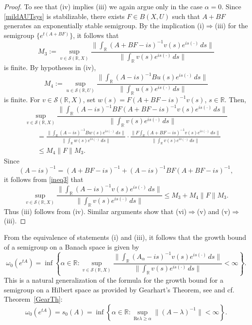 \documentclass[10pt,psamsfonts,leqno]{siamltex}
\newcommand{\bbR}{\mathbb{R}}
\newcommand{\calS}{\mathcal{S}}
\newcommand{\lb}{\label}
\begin{document}
\begin{proof}
To see that (iv) implies (iii) we again argue only in the case
$\alpha=0$. Since \eqref{mildAUTsys} is stabilizable, there exists $F\in
B(X,U)$ such that $A+BF$ generates an exponentially stable semigroup.
By the implication (i)$\Rightarrow$(iii) for the semigroup
$\{e^{t(A+BF)}\}$,
 it follows that
\begin{equation*}
M_3 := \sup_{v\in \calS(\bbR, X)}
\frac{\| \int_\bbR (A+BF-is)^{-1}v(s)e^{is(\cdot)}\,ds\| }
{\| \int_\bbR v(s)e^{is(\cdot)}\,ds\| }
\end{equation*}
is finite.  By hypotheses in (iv),
\begin{equation*}
M_4:=\sup_{u\in \calS(\bbR, U)}
\frac{\|\int_\bbR (A-is)^{-1}Bu(s)e^{is(\cdot)}\,ds\|}
{\|\int_\bbR u(s)e^{is(\cdot)}\,ds\|}
\end{equation*}
is finite.  For $v\in \calS(\bbR,X)$,
set $w(s)= F(A+BF-is)^{-1}v(s)$,
$s\in\bbR$. Then,
\begin{equation}\lb{ineq3}
\sup_{v\in \calS(\bbR, X)}
\frac{\| \int_\bbR(A-is)^{-1}BF (A+BF-is)^{-1}v(s)e^{is(\cdot)}\,ds\| }
{\| \int_\bbR v(s)e^{is(\cdot)}\,ds\| }
\end{equation}
\begin{align*}
&=\frac{\| \int_\bbR(A-is)^{-1}Bw(s)e^{is(\cdot)}\,ds\| }
{\| \int_\bbR w(s)e^{is(\cdot)}\,ds\| }\cdot\frac{\|
F\int_\bbR(A+BF-is)^{-1}v(s)e^{is(\cdot)}\,ds\| }
{\| \int_\bbR v(s)e^{is(\cdot)}\,ds\| }\\
&\le M_4 \| F \| M_3.
\end{align*}
Since
\begin{equation*}
(A-is)^{-1} = (A+BF-is)^{-1} + (A-is)^{-1}BF(A+BF-is)^{-1},
\end{equation*}
it follows from \eqref{ineq3} that
\begin{equation*}
\sup_{v\in \calS(\bbR, X)}\frac{\|
\int_\bbR(A-is)^{-1}v(s)e^{is(\cdot)}\,ds\| }
{\| \int_\bbR v(s)e^{is(\cdot)}\,ds\| }\le M_3 + M_4 \| F \| M_3.
\end{equation*}
Thus (iii) follows from (iv).
Similar arguments show that (vi)$\Rightarrow$(v) and
(v)$\Rightarrow$(iii).
\end{proof}
{}From the equivalence of statements (i) and (iii), it follows that
the growth bound of a semigroup on a Banach space is given by
$$
\omega_0(e^{tA})=\inf\left\{\alpha\in\bbR:\sup_{v\in \calS(\bbR,X)}
\frac{\|\int_\bbR
  (A_\alpha-is)^{-1}v(s)e^{is(\cdot)}\,ds\|}
  {\|\int_\bbR v(s)e^{is(\cdot)}\,ds\|}<\infty\right\}.
$$
This is a natural generalization of the formula for the growth bound
for a semigroup on a Hilbert space as provided by Gearhart's
Theorem, see \cite{Huang,Nagel,vanNbook,Prus} and cf.
Theorem~\ref{GearTh}:
$$
\omega_0(e^{tA})=s_0(A)=\inf\left\{\alpha\in\bbR:
\sup_{\mbox{Re}\lambda\ge\alpha}\|(A-\lambda)^{-1}\|<\infty\right\}.
$$
\end{document}

